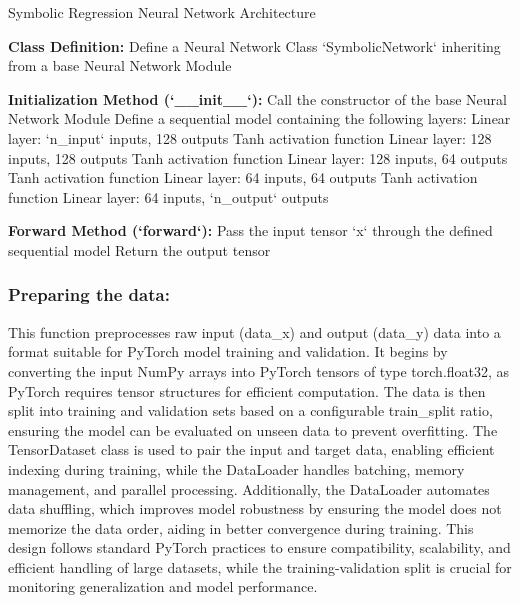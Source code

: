 \documentclass{article}
\begin{document}
\begin{algorithm}[H]
\SetAlgoLined
\caption{Symbolic Regression Neural Network Architecture}
\label{alg:symbolic_network} %

\textbf{Class Definition:}\;
Define a Neural Network Class `SymbolicNetwork` inheriting from a base Neural Network Module\;

\textbf{Initialization Method (`__init__`):}\;
\;
Call the constructor of the base Neural Network Module\;
Define a sequential model containing the following layers:\;
\Indp %
Linear layer: `n_input` inputs, 128 outputs\;
Tanh activation function\;
Linear layer: 128 inputs, 128 outputs\;
Tanh activation function\;
Linear layer: 128 inputs, 64 outputs\;
Tanh activation function\;
Linear layer: 64 inputs, 64 outputs\;
Tanh activation function\;
Linear layer: 64 inputs, `n_output` outputs\;
\Indm %

\textbf{Forward Method (`forward`):}\;
\;
\;
Pass the input tensor `x` through the defined sequential model\;
Return the output tensor\;

\end{algorithm}







\subsubsection{Preparing the data:}

This function preprocesses raw input (data\_x) and output (data\_y) data into a format suitable for PyTorch model training and validation. It begins by converting the input NumPy arrays into PyTorch tensors of type torch.float32, as PyTorch requires tensor structures for efficient computation. The data is then split into training and validation sets based on a configurable train\_split ratio, ensuring the model can be evaluated on unseen data to prevent overfitting. The TensorDataset class is used to pair the input and target data, enabling efficient indexing during training, while the DataLoader handles batching, memory management, and parallel processing. Additionally, the DataLoader automates data shuffling, which improves model robustness by ensuring the model does not memorize the data order, aiding in better convergence during training. This design follows standard PyTorch practices to ensure compatibility, scalability, and efficient handling of large datasets, while the training-validation split is crucial for monitoring generalization and model performance.\\
\end{document}
